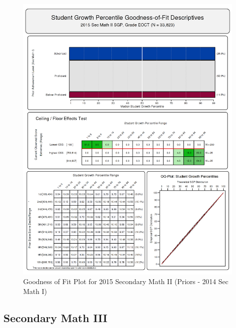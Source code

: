 \documentclass[12pt]{article}
\begin{document}
\begin{figure}[htbp]
\centering
\includegraphics{../img/Goodness_of_Fit/SEC_MATH_II.2015/2015_SEC_MATH_II_EOCT;2014_SEC_MATH_I_EOCT.png}
\caption{Goodness of Fit Plot for 2015 Secondary Math II (Priors - 2014
Sec Math I)}
\end{figure}

\clearpage 

\subsection{Secondary Math III}\label{secondary-math-iii}
\end{document}
